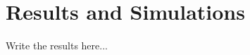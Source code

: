 \def\baselinestretch{1}
\chapter{Results and Simulations}
\label{chap:results}
\ifpdf
    \graphicspath{{Results/Figures/PNG/}{Results/Figures/PDF/}{Results/Figures/}}
\else
    \graphicspath{{Results/Figures/EPS/}{Results/Figures/}}
\fi

Write the results here...
